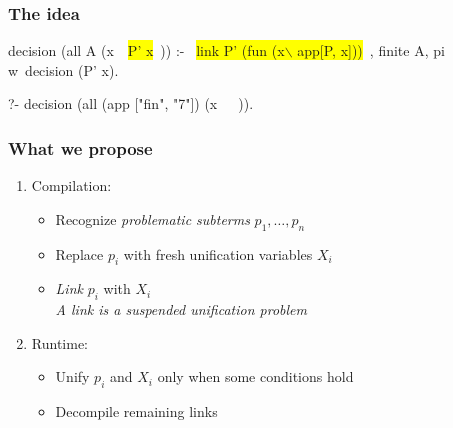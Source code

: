 \documentclass{pres}
\newcommand{\sepFrame}[1]{
  \section{#1}
  \begin{frame}
    \centering
    {\usebeamerfont*{frametitle}\usebeamercolor[fg]{frametitle} #1}
  \end{frame}
}
\begin{document}
\begin{frame}[fragile]
  \frametitle{The idea}

  \begin{elpicode}
    decision (all A (x\ ~\colorbox{yellow}{P' x}~)) :-                      %
      ~\colorbox{yellow}{link P' (fun (x$\backslash$ app[P, x]))}~, 
      finite A,
      pi w\ decision (P' x).

    ?- decision (all (app ["fin", "7"])                 %
                        (x\ ~\appnfactPyg~)).
  \end{elpicode}
  

\end{frame}


\begin{frame}
  \frametitle{What we propose}

  \begin{enumerate}
    \item Compilation:
    \begin{itemize}
      \item Recognize \textit{problematic subterms} $p_1,\dots,p_n$
      \item Replace $p_i$ with fresh unification variables $X_i$
      \item \textit{Link} $p_i$ with $X_i$\\
        \quad \textit{A link is a suspended unification problem}
    \end{itemize}
    \item Runtime:
    \begin{itemize}
      \item Unify $p_i$ and $X_i$ only when some conditions hold
      \item Decompile remaining links
    \end{itemize}
  \end{enumerate}



\end{frame}
\end{document}
